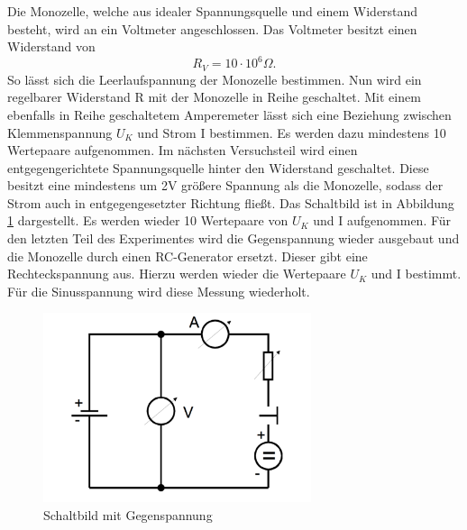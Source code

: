 Die Monozelle, welche aus idealer Spannungsquelle und einem Widerstand besteht,
wird an ein Voltmeter angeschlossen. Das Voltmeter besitzt einen Widerstand von
\begin{equation*}
  R_{V}=10\cdot10^6\Omega.
\end{equation*}
So lässt sich die Leerlaufspannung der Monozelle bestimmen.
Nun wird ein regelbarer Widerstand R mit der Monozelle in Reihe geschaltet.
Mit einem ebenfalls in Reihe geschaltetem Amperemeter lässt sich eine Beziehung zwischen
Klemmenspannung $U_K$ und Strom I bestimmen. Es werden dazu mindestens 10 Wertepaare aufgenommen.
Im nächsten Versuchsteil wird einen entgegengerichtete Spannungsquelle hinter den Widerstand geschaltet.
Diese besitzt eine mindestens um 2V größere Spannung als die Monozelle, sodass der Strom auch in entgegengesetzter Richtung fließt.
Das Schaltbild ist in Abbildung \ref{fig:Gegenspannung} dargestellt.
Es werden wieder 10 Wertepaare von $U_K$ und I aufgenommen.
Für den letzten Teil des Experimentes wird die Gegenspannung wieder ausgebaut und die Monozelle durch einen RC-Generator ersetzt.
Dieser gibt eine Rechteckspannung aus. Hierzu werden wieder die Wertepaare $U_K$ und I bestimmt.
Für die Sinusspannung wird diese Messung wiederholt.

\begin{figure}[h!]
  \centering
  \includegraphics[width=0.7\textwidth]{Gegenspannung.pdf}
  \caption{Schaltbild mit Gegenspannung \cite{1}}
  \label{fig:Gegenspannung}
\end{figure}
